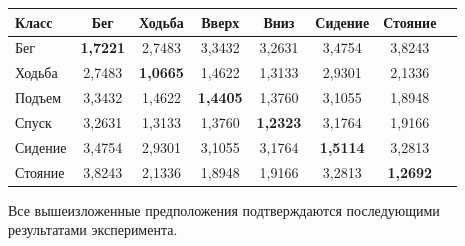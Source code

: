 \begin{table}\small

\vspace*{-3pt}

\begin{center}


\vspace*{2ex}





\begin{tabular}{|l|c|c|c|c|c|c|c|}

\hline

       Класс  & Бег & Ходьба & Вверх & Вниз & Сидение & Стояние \\

        \hline

        Бег   &\textbf{1,7221}  &  2,7483  &  3,3432  &  3,2631  &  3,4754  &  3,8243\\

        Ходьба   & 2,7483  &  \textbf{1,0665} &   1,4622  &  1,3133  &  2,9301  &  2,1336\\

        Подъем   & 3,3432    &     1,4622 &   \textbf{1,4405}    &1,3760&    3,1055   & 1,8948\\

        Спуск   & 3,2631   &      1,3133  &       1,3760   & \textbf{1,2323} &   3,1764  &  1,9166\\

        Сидение   & 3,4754  &       2,9301   &      3,1055  &       3,1764  &  \textbf{1,5114} &   3,2813\\

        Стояние   & 3,8243 &        2,1336    &     1,8948 &        1,9166   &      3,2813&   \textbf{ 1,2692}\\

        \hline

\end{tabular}

\end{center}

\vspace*{-9pt}

\end{table}



Все вышеизложенные предположения подтверждаются последующими результатами эксперимента.



